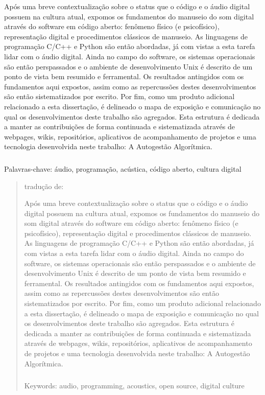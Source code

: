 \begin{resumo}

Após uma breve contextualização sobre o status que o código e o áudio digital possuem na cultura atual,
expomos os fundamentos do manuseio do som digital através do software em código aberto: fenômeno
físico (e psicofísico), representação digital e procedimentos clássicos de manuseio. As linguagens de programação C/C++ e Python
são então abordadas, já com vistas a esta tarefa lidar com o áudio digital. Ainda no campo do software,
os sistemas operacionais são então perspassados e o ambiente de desenvolvimento Unix é descrito de um ponto
de vista bem resumido e ferramental. Os resultados antingidos com os fundamentos aqui expostos,
assim como as repercussões destes desenvolvimentos são então sistematizados por escrito. 
Por fim, como um produto adicional relacionado a esta dissertação, é delineado o mapa de exposição e comunicação no qual
os desenvolvimentos deste trabalho são agregados. Esta estrutura é dedicada a manter as contribuições
de forma continuada e sistematizada através de webpages, wikis, repositórios, aplicativos de acompanhamento de projetos
e uma tecnologia desenvolvida neste trabalho: A Autogestão Algorítmica.


$\phantom{linha em branco}$\\
Palavras-chave: áudio, programação, acústica, código aberto, cultura digital

\end{resumo}

\begin{abstract}

tradução de:

Após uma breve contextualização sobre o status que o código e o áudio digital possuem na cultura atual,
expomos os fundamentos do manuseio do som digital através do software em código aberto: fenômeno
físico (e psicofísico), representação digital e procedimentos clássicos de manuseio. As linguagens de programação C/C++ e Python
são então abordadas, já com vistas a esta tarefa lidar com o áudio digital. Ainda no campo do software,
os sistemas operacionais são então perspassados e o ambiente de desenvolvimento Unix é descrito de um ponto
de vista bem resumido e ferramental. Os resultados antingidos com os fundamentos aqui expostos,
assim como as repercussões destes desenvolvimentos são então sistematizados por escrito. 
Por fim, como um produto adicional relacionado a esta dissertação, é delineado o mapa de exposição e comunicação no qual
os desenvolvimentos deste trabalho são agregados. Esta estrutura é dedicada a manter as contribuições
de forma continuada e sistematizada através de webpages, wikis, repositórios, aplicativos de acompanhamento de projetos
e uma tecnologia desenvolvida neste trabalho: A Autogestão Algorítmica.

$\phantom{linha em branco}$\\
Keywords: audio, programming, acoustics, open source, digital culture

\end{abstract}